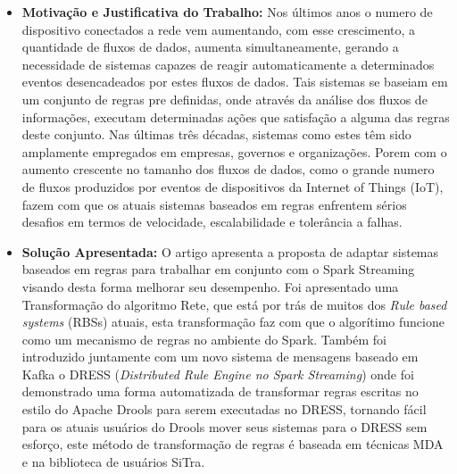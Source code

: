 \documentclass[tid,table]{texufpel} %
\begin{document}
\begin{itemize}
	\item \textbf{Motivação e Justificativa do Trabalho:} Nos últimos anos o numero de dispositivo conectados a rede vem aumentando, com esse crescimento, a quantidade de fluxos de dados, aumenta simultaneamente, gerando a necessidade de sistemas capazes de reagir automaticamente a determinados eventos desencadeados por estes fluxos de dados. Tais sistemas se baseiam em um conjunto de regras pre definidas, onde através da análise dos fluxos de informações, executam determinadas ações que satisfação a alguma das regras deste conjunto. Nas últimas três décadas, sistemas como estes têm sido amplamente empregados em empresas, governos e organizações. Porem com o aumento crescente no tamanho dos fluxos de dados, como o grande numero de fluxos produzidos por eventos de dispositivos da Internet of Things (IoT), fazem com que os atuais sistemas baseados em regras enfrentem sérios desafios em termos de velocidade, escalabilidade e tolerância a falhas.
	
	\item \textbf{Solução Apresentada:} O artigo apresenta a proposta de adaptar sistemas baseados em regras para trabalhar em conjunto com o Spark Streaming visando desta forma melhorar seu desempenho. Foi apresentado uma Transformação do algoritmo Rete, que está por trás de muitos dos \textit{Rule based systems} (RBSs) atuais, esta transformação faz com que o algorítimo funcione como um mecanismo de regras no ambiente do Spark. Também foi introduzido juntamente com um novo sistema de mensagens baseado em Kafka o DRESS (\textit{Distributed Rule Engine no Spark Streaming}) onde foi demonstrado uma forma automatizada de transformar regras escritas no estilo do Apache Drools para serem executadas no DRESS, tornando fácil para os atuais usuários do Drools mover seus sistemas para o DRESS sem esforço, este método de transformação de regras é baseada em técnicas MDA e na biblioteca de usuários SiTra.
	

\end{itemize}
\end{document}
